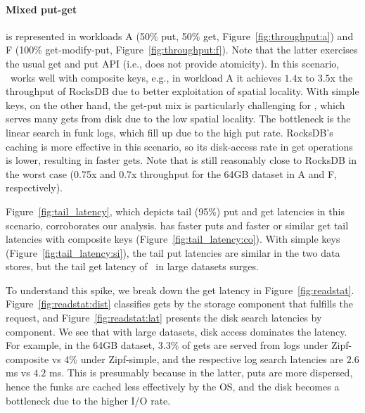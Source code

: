 \paragraph{ Mixed put-get} is represented in workloads A (50\% put, 50\% get, Figure~\ref{fig:throughput:a}) and 
F (100\% get-modify-put, Figure~\ref{fig:throughput:f}). Note that the latter exercises the usual get and put API (i.e., does not provide atomicity). 
In this scenario, \sys\ works well with composite keys, e.g., in workload A it  achieves $1.4$x to $3.5$x the throughput of RocksDB due to better exploitation of spatial locality. 
With simple keys, on the other hand, the get-put mix is particularly challenging for \sys, which serves many gets from disk due to the
low spatial locality. The bottleneck is the linear search in funk logs, which  fill
up due to the high put rate.
RocksDB's caching is more effective in this scenario, so its disk-access rate in get operations is lower,  resulting in faster gets. 
Note that \sys\/ is still reasonably close to RocksDB in the worst case 
(0.75x and 0.7x throughput for the 64GB dataset in A and F, respectively).

Figure~\ref{fig:tail_latency}, which depicts tail (95\%) put and get latencies in this scenario, 
corroborates our analysis. \sys\/ has faster puts and faster or similar get tail latencies with composite keys
(Figure~\ref{fig:tail_latency:co}). With simple keys (Figure~\ref{fig:tail_latency:si}),  
the tail put latencies are similar in the two data stores, but the tail get latency of \sys\ 
in large datasets surges.

 To understand this spike, 
we break down the get latency in  Figure~\ref{fig:readstat}. 
Figure~\ref{fig:readstat:dist} classifies gets by the storage  component 
that fulfills the request, and Figure~\ref{fig:readstat:lat} presents the disk search latencies by component. 
We see that with large datasets, disk access dominates the latency.
For example, in the 64GB dataset, $3.3\%$ of gets are served from logs under Zipf-composite vs $4\%$ under Zipf-simple,
and the respective log search latencies are $2.6$ ms vs $4.2$ ms. This is presumably because in the latter, puts are more dispersed, 
hence the funks are cached less effectively by the OS, and the disk becomes a bottleneck due to the higher I/O rate.



